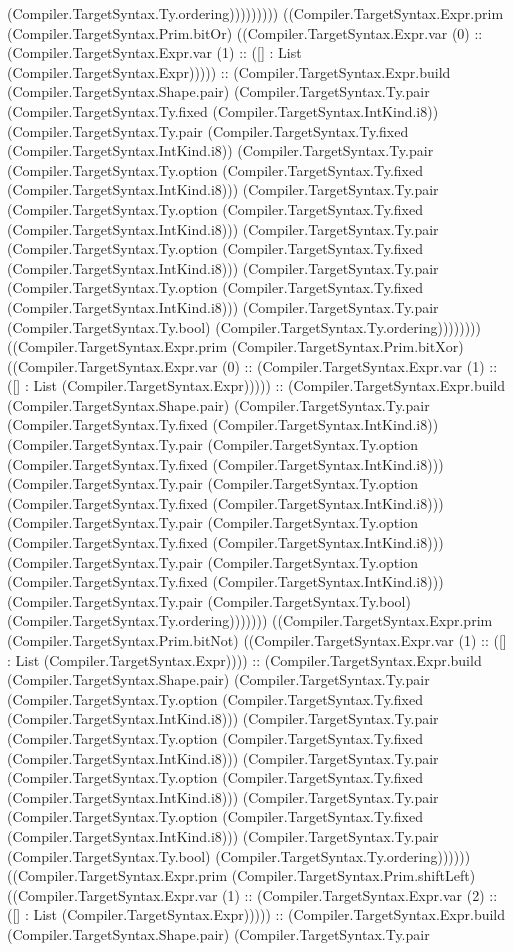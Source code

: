 \documentclass[11pt]{article}
\begin{document}
(Compiler.TargetSyntax.Ty.ordering))))))))) ((Compiler.TargetSyntax.Expr.prim (Compiler.TargetSyntax.Prim.bitOr) ((Compiler.TargetSyntax.Expr.var (0) :: (Compiler.TargetSyntax.Expr.var (1) :: ([] : List (Compiler.TargetSyntax.Expr))))) :: (Compiler.TargetSyntax.Expr.build (Compiler.TargetSyntax.Shape.pair) (Compiler.TargetSyntax.Ty.pair (Compiler.TargetSyntax.Ty.fixed (Compiler.TargetSyntax.IntKind.i8)) (Compiler.TargetSyntax.Ty.pair (Compiler.TargetSyntax.Ty.fixed (Compiler.TargetSyntax.IntKind.i8)) (Compiler.TargetSyntax.Ty.pair (Compiler.TargetSyntax.Ty.option (Compiler.TargetSyntax.Ty.fixed (Compiler.TargetSyntax.IntKind.i8))) (Compiler.TargetSyntax.Ty.pair (Compiler.TargetSyntax.Ty.option (Compiler.TargetSyntax.Ty.fixed (Compiler.TargetSyntax.IntKind.i8))) (Compiler.TargetSyntax.Ty.pair (Compiler.TargetSyntax.Ty.option (Compiler.TargetSyntax.Ty.fixed (Compiler.TargetSyntax.IntKind.i8))) (Compiler.TargetSyntax.Ty.pair (Compiler.TargetSyntax.Ty.option (Compiler.TargetSyntax.Ty.fixed (Compiler.TargetSyntax.IntKind.i8))) (Compiler.TargetSyntax.Ty.pair (Compiler.TargetSyntax.Ty.bool) (Compiler.TargetSyntax.Ty.ordering)))))))) ((Compiler.TargetSyntax.Expr.prim (Compiler.TargetSyntax.Prim.bitXor) ((Compiler.TargetSyntax.Expr.var (0) :: (Compiler.TargetSyntax.Expr.var (1) :: ([] : List (Compiler.TargetSyntax.Expr))))) :: (Compiler.TargetSyntax.Expr.build (Compiler.TargetSyntax.Shape.pair) (Compiler.TargetSyntax.Ty.pair (Compiler.TargetSyntax.Ty.fixed (Compiler.TargetSyntax.IntKind.i8)) (Compiler.TargetSyntax.Ty.pair (Compiler.TargetSyntax.Ty.option (Compiler.TargetSyntax.Ty.fixed (Compiler.TargetSyntax.IntKind.i8))) (Compiler.TargetSyntax.Ty.pair (Compiler.TargetSyntax.Ty.option (Compiler.TargetSyntax.Ty.fixed (Compiler.TargetSyntax.IntKind.i8))) (Compiler.TargetSyntax.Ty.pair (Compiler.TargetSyntax.Ty.option (Compiler.TargetSyntax.Ty.fixed (Compiler.TargetSyntax.IntKind.i8))) (Compiler.TargetSyntax.Ty.pair (Compiler.TargetSyntax.Ty.option (Compiler.TargetSyntax.Ty.fixed (Compiler.TargetSyntax.IntKind.i8))) (Compiler.TargetSyntax.Ty.pair (Compiler.TargetSyntax.Ty.bool) (Compiler.TargetSyntax.Ty.ordering))))))) ((Compiler.TargetSyntax.Expr.prim (Compiler.TargetSyntax.Prim.bitNot) ((Compiler.TargetSyntax.Expr.var (1) :: ([] : List (Compiler.TargetSyntax.Expr)))) :: (Compiler.TargetSyntax.Expr.build (Compiler.TargetSyntax.Shape.pair) (Compiler.TargetSyntax.Ty.pair (Compiler.TargetSyntax.Ty.option (Compiler.TargetSyntax.Ty.fixed (Compiler.TargetSyntax.IntKind.i8))) (Compiler.TargetSyntax.Ty.pair (Compiler.TargetSyntax.Ty.option (Compiler.TargetSyntax.Ty.fixed (Compiler.TargetSyntax.IntKind.i8))) (Compiler.TargetSyntax.Ty.pair (Compiler.TargetSyntax.Ty.option (Compiler.TargetSyntax.Ty.fixed (Compiler.TargetSyntax.IntKind.i8))) (Compiler.TargetSyntax.Ty.pair (Compiler.TargetSyntax.Ty.option (Compiler.TargetSyntax.Ty.fixed (Compiler.TargetSyntax.IntKind.i8))) (Compiler.TargetSyntax.Ty.pair (Compiler.TargetSyntax.Ty.bool) (Compiler.TargetSyntax.Ty.ordering)))))) ((Compiler.TargetSyntax.Expr.prim (Compiler.TargetSyntax.Prim.shiftLeft) ((Compiler.TargetSyntax.Expr.var (1) :: (Compiler.TargetSyntax.Expr.var (2) :: ([] : List (Compiler.TargetSyntax.Expr))))) :: (Compiler.TargetSyntax.Expr.build (Compiler.TargetSyntax.Shape.pair) (Compiler.TargetSyntax.Ty.pair 
\end{document}
